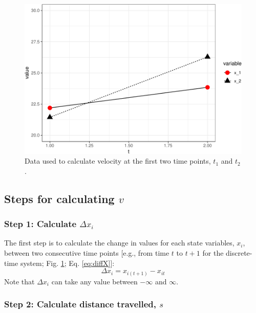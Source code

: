 \documentclass[12pt,twoside,openany]{reedthesis}
\begin{document}
\begin{figure}
\includegraphics[width=0.85\linewidth]{_myDissertation_files/figure-latex/sysEx2-1} \caption{Data used to calculate velocity at the first two time points, $t_1$ and $t_2$.}\label{fig:sysEx2}
\end{figure}
\hypertarget{steps-for-calculating-v}{%
\subsection{\texorpdfstring{Steps for calculating \(v\)}{Steps for calculating v}}\label{steps-for-calculating-v}}

\hypertarget{step-1-calculate-delta-x_i}{%
\subsubsection{\texorpdfstring{Step 1: Calculate \(\Delta x_i\)}{Step 1: Calculate \textbackslash Delta x\_i}}\label{step-1-calculate-delta-x_i}}

The first step is to calculate the change in values for each state variables, \(x_i\), between two consecutive time points {[}e.g., from time \(t\) to \(t+1\) for the discrete-time system; Fig. \ref{fig:sysEx2}; Eq. \eqref{eq:diffX}{]}:
\begin{equation}
\Delta x_i = x_{i(t+1)} - x_{it} 
\label{eq:diffX}
\end{equation}
Note that \(\Delta x_i\) can take any value between \(-\infty\) and \(\infty\).

\hypertarget{step-2-calculate-distance-travelled-s}{%
\subsubsection{\texorpdfstring{Step 2: Calculate distance travelled, \(s\)}{Step 2: Calculate distance travelled, s}}\label{step-2-calculate-distance-travelled-s}}
\end{document}
